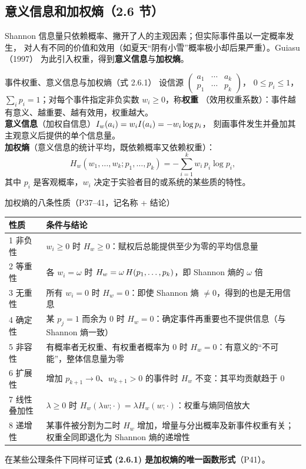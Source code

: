 \subsection{意义信息和加权熵（2.6 节）}

Shannon 信息量只依赖概率、撇开了人的主观因素；但实际事件虽以一定概率发生，
对人有不同的价值和效用（如夏天“阴有小雪”概率极小却后果严重）。Guiasu（1997）
为此引入权重，得到\textbf{意义信息}与\textbf{加权熵}。

\begin{defbox}{事件权重、意义信息与加权熵（式 2.6.1）}
设信源 $\begin{pmatrix}a_1 & \cdots & a_k\\ p_1 & \cdots & p_k\end{pmatrix}$，
$0\le p_i\le1$，$\sum_i p_i=1$；对每个事件指定非负实数 $w_i\ge0$，称\textbf{权重}
（效用权重系数）：事件越有意义、越重要、越有效用，权重越大。\\
\textbf{意义信息}（加权自信息）$I_w(a_i)=w_iI\!\left(a_i\right)=-w_i\log p_i$，
刻画事件发生并叠加其主观意义后提供的单个信息量。\\
\textbf{加权熵}（意义信息的统计平均，既依赖概率又依赖权重）：
\[
H_w(w_1,\dots,w_k;p_1,\dots,p_k)=-\sum_{i=1}^{k}w_i\,p_i\log p_i ,
\]
其中 $p_i$ 是客观概率，$w_i$ 决定于实验者目的或系统的某些质的特性。
\end{defbox}

\begin{keypoint}{加权熵的八条性质（P37--41，记名称 + 结论）}
\begin{center}
\renewcommand{\arraystretch}{1.15}
\begin{tabular}{@{}p{1.75cm}p{11.2cm}@{}}
\toprule
性质 & 条件与结论 \\
\midrule
1 非负性 & $w_i\ge0$ 时 $H_w\ge0$：赋权后总能提供至少为零的平均信息量 \\
2 等重性 & 各 $w_i=\omega$ 时 $H_w=\omega\,H\!\left(p_1,\dots,p_k\right)$，即 Shannon 熵的 $\omega$ 倍 \\
3 无重性 & 所有 $w_i=0$ 时 $H_w=0$：即使 Shannon 熵 $\neq0$，得到的也是无用信息 \\
4 确定性 & 某 $p_j=1$ 而余为 $0$ 时 $H_w=0$：确定事件再重要也不提供信息（与 Shannon 熵一致）\\
5 非容性 & 有概率者无权重、有权重者概率为 $0$ 时 $H_w=0$：有意义的“不可能”，整体信息量为零 \\
6 扩展性 & 增加 $p_{k+1}\to0$、$w_{k+1}>0$ 的事件时 $H_w$ 不变：其平均贡献趋于 $0$ \\
7 线性叠加性 & $\lambda\ge0$ 时 $H_w(\lambda w;\cdot)=\lambda H_w(w;\cdot)$：权重与熵同倍放大 \\
8 递增性 & 某事件被分割为二时 $H_w$ 增加，增量与分出概率及新事件权重有关；权重全同即退化为 Shannon 熵的递增性 \\
\bottomrule
\end{tabular}
\end{center}
在某些公理条件下同样可证\textbf{式 (2.6.1) 是加权熵的唯一函数形式}（P41）。
\end{keypoint}


